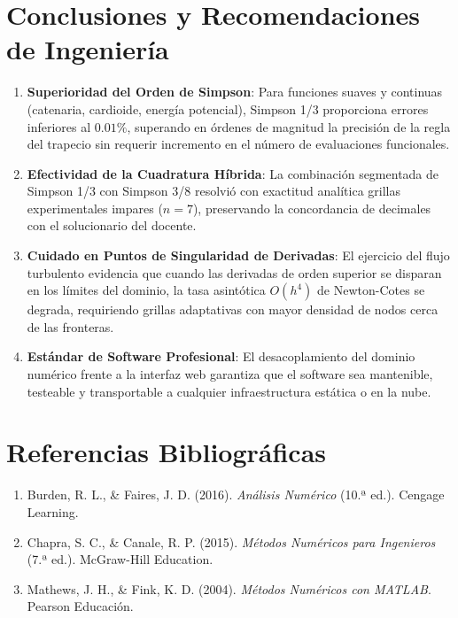 \documentclass[11pt,a4paper]{article}
\begin{document}
\section{Conclusiones y Recomendaciones de Ingeniería}

\begin{enumerate}
    \item \textbf{Superioridad del Orden de Simpson}: Para funciones suaves y continuas (catenaria, cardioide, energía potencial), Simpson 1/3 proporciona errores inferiores al $0.01\%$, superando en órdenes de magnitud la precisión de la regla del trapecio sin requerir incremento en el número de evaluaciones funcionales.
    \item \textbf{Efectividad de la Cuadratura Híbrida}: La combinación segmentada de Simpson 1/3 con Simpson 3/8 resolvió con exactitud analítica grillas experimentales impares ($n=7$), preservando la concordancia de decimales con el solucionario del docente.
    \item \textbf{Cuidado en Puntos de Singularidad de Derivadas}: El ejercicio del flujo turbulento evidencia que cuando las derivadas de orden superior se disparan en los límites del dominio, la tasa asintótica $O(h^4)$ de Newton-Cotes se degrada, requiriendo grillas adaptativas con mayor densidad de nodos cerca de las fronteras.
    \item \textbf{Estándar de Software Profesional}: El desacoplamiento del dominio numérico frente a la interfaz web garantiza que el software sea mantenible, testeable y transportable a cualquier infraestructura estática o en la nube.
\end{enumerate}

\section*{Referencias Bibliográficas}
\begin{enumerate}
    \item Burden, R. L., \& Faires, J. D. (2016). \textit{Análisis Numérico} (10.ª ed.). Cengage Learning.
    \item Chapra, S. C., \& Canale, R. P. (2015). \textit{Métodos Numéricos para Ingenieros} (7.ª ed.). McGraw-Hill Education.
    \item Mathews, J. H., \& Fink, K. D. (2004). \textit{Métodos Numéricos con MATLAB}. Pearson Educación.
\end{enumerate}
\end{document}
